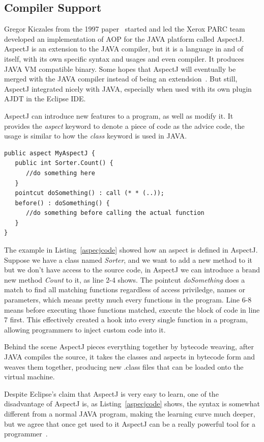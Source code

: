 \subsection{Compiler Support}

Gregor Kiczales from the 1997 paper~\cite{aop} started and led the Xerox PARC team developed an implementation of AOP for the JAVA platform called AspectJ. AspectJ is an extension to the JAVA compiler, but it is a language in and of itself, with its own specific syntax and usages and even compiler. It produces JAVA VM compatible binary. Some hopes that AspectJ will eventually be merged with the JAVA compiler instead of being an extendsion~\cite{aspectj_faq}. But still, AspectJ integrated nicely with JAVA, especially when used with its own plugin AJDT in the Eclipse IDE.

AspectJ can introduce new features to a program, as well as modify it. It provides the {\em aspect} keyword to denote a piece of code as the advice code, the usage is similar to how the {\em class} keyword is used in JAVA.

\begin{lstlisting}[caption={sample aspectj code}, label=aspecjcode]
public aspect MyAspectJ {
   public int Sorter.Count() {
      //do something here
   }
   pointcut doSomething() : call (* * (..));
   before() : doSomething() {
      //do something before calling the actual function
   }
}
\end{lstlisting}

The example in Listing~\ref{aspecjcode} showed how an aspect is defined in AspectJ. Suppose we have a class named {\em Sorter}, and we want to add a new method to it but we don't have access to the source code, in AspectJ we can introduce a brand new method {\em Count} to it, as line 2-4 shows. The pointcut {\em doSomething} does a match to find all matching functions regardless of access priviledge, names or parameters, which means pretty much every functions in the program. Line 6-8 means before executing those functions matched, execute the block of code in line 7 first. This effectively created a hook into every single function in a program, allowing programmers to inject custom code into it.

Behind the scene AspectJ pieces everything together by bytecode weaving, after JAVA compiles the source, it takes the classes and aspects in bytecode form and weaves them together, producing new .class files that can be loaded onto the virtual machine.

Despite Eclipse's claim that AspectJ is very easy to learn, one of the disadvantage of AspectJ is, as Listing~\ref{aspecjcode} shows, the syntax is somewhat different from a normal JAVA program, making the learning curve much deeper, but we agree that once get used to it AspectJ can be a really powerful tool for a programmer~\cite{aspectj_text}.

